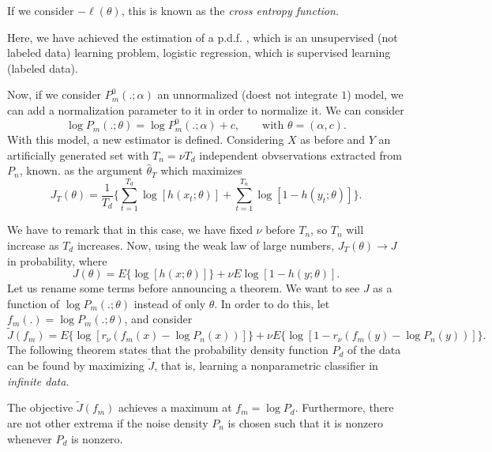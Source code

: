\begin{remark}
If we consider $-\ell(\theta)$, this is known as the \emph{cross entropy function}.
\end{remark}

\begin{remark}
    Here, we have achieved the estimation of a p.d.f. , which is an unsupervised (not labeled data) learning problem, logistic regression, which is supervised learning (labeled data).
\end{remark}

Now, if we consider $P_m^0(.;\alpha)$ an unnormalized (doest not integrate $1$) model, we can add a normalization parameter to it in order to normalize it. We can consider
\[
\log P_m(.;\theta) = \log P_m^0(.;\alpha ) + c  , \quad \quad \text{with } \theta=(\alpha,c).
\]
With this model, a new estimator is defined. Considering $X$ as before and $Y$ an artificially generated set with $T_n = \nu T_d$ independent obvservations extracted from $P_n$, known. as the argument $\hat{\theta}_T$ which maximizes
\[
J_T(\theta) = \frac{1}{T_d}\{\sum_{t = 1}^{T_d} \log[h(x_t;\theta)] + \sum_{t=1}^{T_n}\log[1-h(y_t;\theta)]\}.
\]

We have to remark that in this case, we have fixed $\nu$ before $T_n$, so $T_n$ will increase as $T_d$ increases. Now, using the weak law of large numbers, $J_T(\theta) \to J$ in probability, where
\[
J(\theta) = E\{\log[h(x;\theta)]\} + \nu E{\log[1-h(y;\theta)]}.
\]
Let us rename some terms before announcing a theorem. We want to see $J$ as a function of $\log P_m(.;\theta)$ instead of only $\theta$. In order to do this, let $f_m(.) = \log P_m(.;\theta)$, and consider
\[
\tilde{J}(f_m) = E\{\log[r_\nu (f_m(x) - \log P_n(x))]\} + \nu E\{\log [1- r_\nu(f_m(y) - \log P_n(y))]\}.    
\]
The following theorem states that the probability density function $P_d$ of the data can be found by maximizing $\tilde{J}$, that is, learning a nonparametric classifier in \emph{infinite data}.

\begin{nth}
The objective $\tilde{J}(f_m)$ achieves a maximum at $f_m = \log P_d$. Furthermore, there are not other extrema if the noise density $P_n$ is chosen such that it is nonzero whenever $P_d$ is nonzero.
\end{nth}